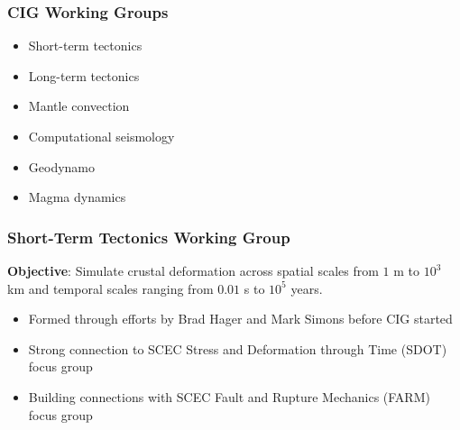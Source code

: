 \documentclass[aspectratio=169]{beamer}
\begin{document}
\begin{frame}
  \frametitle{CIG Working Groups}
 
 \begin{itemize}
 \item Short-term tectonics
 \item Long-term tectonics
 \item Mantle convection
 \item Computational seismology
 \item Geodynamo
 \item Magma dynamics
 \end{itemize}

\end{frame}


\begin{frame}
  \frametitle{Short-Term Tectonics Working Group}
  \summary{}
 
 \vfill
 
 \textbf{Objective}: Simulate crustal deformation across spatial
 scales from $1$ m to $10^3$ km and temporal scales ranging from
 $0.01$ s to $10^5$ years.

 \vfill
 \begin{itemize}
 \item Formed through efforts by Brad Hager and Mark Simons before CIG started
 \item Strong connection to SCEC Stress and Deformation through Time
   (SDOT) focus group
 \item Building connections with SCEC Fault and Rupture Mechanics
   (FARM) focus group
 \end{itemize}
\vfill

\end{frame} 
\end{document}
